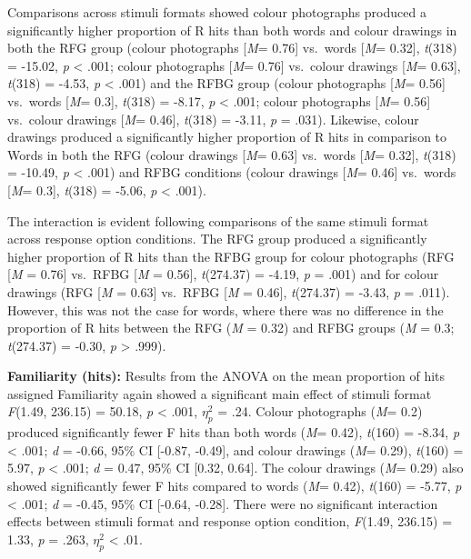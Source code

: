 \documentclass[
  11pt,
]{article}
\begin{document}
Comparisons across stimuli formats showed colour photographs produced a
significantly higher proportion of R hits than both words and colour
drawings in both the RFG group (colour photographs {[}\emph{M}= 0.76{]}
vs.~words {[}\emph{M}= 0.32{]}, \emph{t}(318) = -15.02, \emph{p}
\textless{} .001; colour photographs {[}\emph{M}= 0.76{]} vs.~colour
drawings {[}\emph{M}= 0.63{]}, \emph{t}(318) = -4.53, \emph{p}
\textless{} .001) and the RFBG group (colour photographs {[}\emph{M}=
0.56{]} vs.~words {[}\emph{M}= 0.3{]}, \emph{t}(318) = -8.17, \emph{p}
\textless{} .001; colour photographs {[}\emph{M}= 0.56{]} vs.~colour
drawings {[}\emph{M}= 0.46{]}, \emph{t}(318) = -3.11, \emph{p} = .031).
Likewise, colour drawings produced a significantly higher proportion of
R hits in comparison to Words in both the RFG (colour drawings
{[}\emph{M}= 0.63{]} vs.~words {[}\emph{M}= 0.32{]}, \emph{t}(318) =
-10.49, \emph{p} \textless{} .001) and RFBG conditions (colour drawings
{[}\emph{M}= 0.46{]} vs.~words {[}\emph{M}= 0.3{]}, \emph{t}(318) =
-5.06, \emph{p} \textless{} .001).

The interaction is evident following comparisons of the same stimuli
format across response option conditions. The RFG group produced a
significantly higher proportion of R hits than the RFBG group for colour
photographs (RFG {[}\emph{M} = 0.76{]} vs.~RFBG {[}\emph{M} = 0.56{]},
\emph{t}(274.37) = -4.19, \emph{p} = .001) and for colour drawings (RFG
{[}\emph{M} = 0.63{]} vs.~RFBG {[}\emph{M} = 0.46{]}, \emph{t}(274.37) =
-3.43, \emph{p} = .011). However, this was not the case for words, where
there was no difference in the proportion of R hits between the RFG
(\emph{M} = 0.32) and RFBG groups (\emph{M} = 0.3; \emph{t}(274.37) =
-0.30, \emph{p} \textgreater{} .999).

\textbf{Familiarity (hits):} Results from the ANOVA on the mean
proportion of hits assigned Familiarity again showed a significant main
effect of stimuli format \emph{F}(1.49, 236.15) = 50.18, \emph{p}
\textless{} .001, \(\eta^2_p\) = .24. Colour photographs (\emph{M}= 0.2)
produced significantly fewer F hits than both words (\emph{M}= 0.42),
\emph{t}(160) = -8.34, \emph{p} \textless{} .001; \emph{d} = -0.66, 95\%
CI {[}-0.87, -0.49{]}, and colour drawings (\emph{M}= 0.29),
\emph{t}(160) = 5.97, \emph{p} \textless{} .001; \emph{d} = 0.47, 95\%
CI {[}0.32, 0.64{]}. The colour drawings (\emph{M}= 0.29) also showed
significantly fewer F hits compared to words (\emph{M}= 0.42),
\emph{t}(160) = -5.77, \emph{p} \textless{} .001; \emph{d} = -0.45, 95\%
CI {[}-0.64, -0.28{]}. There were no significant interaction effects
between stimuli format and response option condition, \emph{F}(1.49,
236.15) = 1.33, \emph{p} = .263, \(\eta^2_p\) \textless{} .01.
\end{document}
